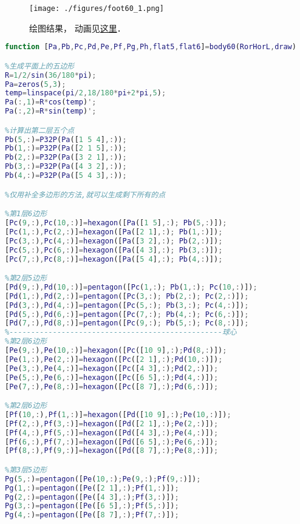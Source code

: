 

\begin{figure}[ht]
\centering
\texttt{[image: ./figures/foot60\_1.png]}
\caption{绘图结果， 动画见\href{https://wuli.wiki/apps/football.html}{这里}．} \label{foot60_fig1}
\end{figure}

\begin{lstlisting}[language=matlab, caption=body60.m]
function [Pa,Pb,Pc,Pd,Pe,Pf,Pg,Ph,flat5,flat6]=body60(RorHorL,draw)

%生成平面上的五边形
R=1/2/sin(36/180*pi);
Pa=zeros(5,3); 
temp=linspace(pi/2,18/180*pi+2*pi,5);
Pa(:,1)=R*cos(temp)';
Pa(:,2)=R*sin(temp)';

%计算出第二层五个点
Pb(5,:)=P32P(Pa([1 5 4],:));
Pb(1,:)=P32P(Pa([2 1 5],:));
Pb(2,:)=P32P(Pa([3 2 1],:));
Pb(3,:)=P32P(Pa([4 3 2],:));
Pb(4,:)=P32P(Pa([5 4 3],:));

%仅用补全多边形的方法,就可以生成剩下所有的点

%第1层6边形
[Pc(9,:),Pc(10,:)]=hexagon([Pa([1 5],:); Pb(5,:)]);
[Pc(1,:),Pc(2,:)]=hexagon([Pa([2 1],:); Pb(1,:)]);
[Pc(3,:),Pc(4,:)]=hexagon([Pa([3 2],:); Pb(2,:)]);
[Pc(5,:),Pc(6,:)]=hexagon([Pa([4 3],:); Pb(3,:)]);
[Pc(7,:),Pc(8,:)]=hexagon([Pa([5 4],:); Pb(4,:)]);

%第2层5边形
[Pd(9,:),Pd(10,:)]=pentagon([Pc(1,:); Pb(1,:); Pc(10,:)]);
[Pd(1,:),Pd(2,:)]=pentagon([Pc(3,:); Pb(2,:); Pc(2,:)]);
[Pd(3,:),Pd(4,:)]=pentagon([Pc(5,:); Pb(3,:); Pc(4,:)]);
[Pd(5,:),Pd(6,:)]=pentagon([Pc(7,:); Pb(4,:); Pc(6,:)]);
[Pd(7,:),Pd(8,:)]=pentagon([Pc(9,:); Pb(5,:); Pc(8,:)]);
%-------------------------------------------------球心
%第2层6边形
[Pe(9,:),Pe(10,:)]=hexagon([Pc([10 9],:);Pd(8,:)]);
[Pe(1,:),Pe(2,:)]=hexagon([Pc([2 1],:);Pd(10,:)]);
[Pe(3,:),Pe(4,:)]=hexagon([Pc([4 3],:);Pd(2,:)]);
[Pe(5,:),Pe(6,:)]=hexagon([Pc([6 5],:);Pd(4,:)]);
[Pe(7,:),Pe(8,:)]=hexagon([Pc([8 7],:);Pd(6,:)]);

%第2层6边形
[Pf(10,:),Pf(1,:)]=hexagon([Pd([10 9],:);Pe(10,:)]);
[Pf(2,:),Pf(3,:)]=hexagon([Pd([2 1],:);Pe(2,:)]);
[Pf(4,:),Pf(5,:)]=hexagon([Pd([4 3],:);Pe(4,:)]);
[Pf(6,:),Pf(7,:)]=hexagon([Pd([6 5],:);Pe(6,:)]);
[Pf(8,:),Pf(9,:)]=hexagon([Pd([8 7],:);Pe(8,:)]);

%第3层5边形
Pg(5,:)=pentagon([Pe(10,:);Pe(9,:);Pf(9,:)]);
Pg(1,:)=pentagon([Pe([2 1],:);Pf(1,:)]);
Pg(2,:)=pentagon([Pe([4 3],:);Pf(3,:)]);
Pg(3,:)=pentagon([Pe([6 5],:);Pf(5,:)]);
Pg(4,:)=pentagon([Pe([8 7],:);Pf(7,:)]);


\end{lstlisting}
